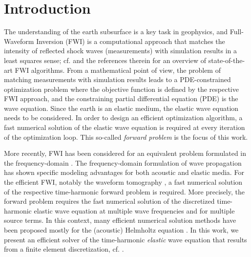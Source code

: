 
\section{Introduction}
\label{intro}
The understanding of the earth subsurface is a key task in geophysics, and Full-Waveform Inversion (FWI) is a computational approach that match\-es the intensity of reflected shock waves (measurements) with simulation results in a least squares sense; cf. \cite{VO09} and the references therein for an overview of state-of-the-art FWI algorithms. From a mathematical point of view, the problem of matching measurements with simulation results leads to a PDE-constrained optimization problem where the objective function is defined by the respective FWI approach, and the constraining partial differential equation (PDE) is the wave equation. Since the earth is an elastic medium, the elastic wave equation needs to be considered. In order to design an efficient optimization algorithm, a fast numerical solution of the elastic wave equation is required at every iteration of the optimization loop. This so-called \textit{forward problem} is the focus of this work.

More recently, FWI has been considered for an equivalent problem formulated in the frequency-domain \cite{MPl04,P99}. The frequency-domain formulation of wave propagation has shown specific modeling advantages for both acoustic and elastic media. For the efficient FWI, notably the waveform tomography \cite{PPS15,VO09}, a fast numerical solution of the respective time-harmonic forward problem is required. More precisely, the forward problem requires the fast numerical solution of the discretized time-harmonic elastic wave equation at multiple wave frequencies and for multiple source terms. In this context, many efficient numerical solution methods have been proposed mostly for the (acoustic) Helmholtz e\-qua\-tion \cite{PN14,P09,PM04,REPMVO06}. In this work, we present an efficient solver of the time-harmonic \textit{elastic} wave equation that results from a finite element discretization, cf. \cite{DBD09,ECVG10}. 

